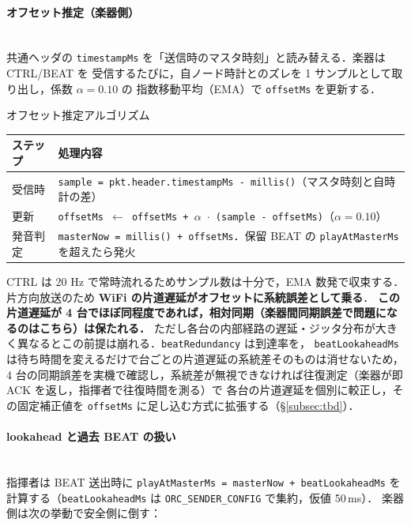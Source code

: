 \documentclass[lualatex,book,paper=a4paper,jafontsize=11.5pt,jafontscale=1.05]{jlreq}
\begin{document}
\paragraph{オフセット推定（楽器側）}\mbox{}\\
共通ヘッダの \texttt{timestampMs} を「送信時のマスタ時刻」と読み替える．楽器は CTRL/BEAT を
受信するたびに，自ノード時計とのズレを 1 サンプルとして取り出し，係数 $\alpha = 0.10$ の
指数移動平均（EMA）で \texttt{offsetMs} を更新する．

\begin{apibox}{オフセット推定アルゴリズム}
\begin{tabular}{l p{}}
\toprule
\textbf{ステップ} & \textbf{処理内容} \\
\midrule
受信時 & \texttt{sample = pkt.header.timestampMs - millis()}（マスタ時刻と自時計の差） \\
更新   & \texttt{offsetMs $\leftarrow$ offsetMs + $\alpha$ $\cdot$ (sample - offsetMs)}（$\alpha = 0.10$） \\
発音判定 & \texttt{masterNow = millis() + offsetMs}．保留 BEAT の \texttt{playAtMasterMs} を超えたら発火 \\
\bottomrule
\end{tabular}
\end{apibox}

CTRL は 20 Hz で常時流れるためサンプル数は十分で，EMA 数発で収束する．
片方向放送のため \textbf{WiFi の片道遅延がオフセットに系統誤差として乗る}．
\textbf{この片道遅延が 4 台でほぼ同程度であれば，相対同期（楽器間同期誤差で問題になるのはこちら）は保たれる．}
ただし各台の内部経路の遅延・ジッタ分布が大きく異なるとこの前提は崩れる．\texttt{beatRedundancy} は到達率を，
\texttt{beatLookaheadMs} は待ち時間を変えるだけで台ごとの片道遅延の系統差そのものは消せないため，
4 台の同期誤差を実機で確認し，系統差が無視できなければ往復測定（楽器が即 ACK を返し，指揮者で往復時間を測る）で
各台の片道遅延を個別に較正し，その固定補正値を \texttt{offsetMs} に足し込む方式に拡張する（\S\ref{subsec:tbd}）．

\paragraph{lookahead と過去 BEAT の扱い}\mbox{}\\
指揮者は BEAT 送出時に \texttt{playAtMasterMs = masterNow + beatLookaheadMs}
を計算する（\texttt{beatLookaheadMs} は \texttt{ORC\_SENDER\_CONFIG} で集約，仮値 50\,ms）．
楽器側は次の挙動で安全側に倒す：
\end{document}
